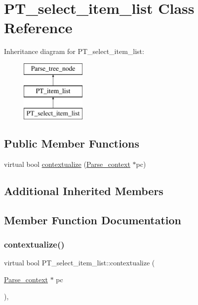 \hypertarget{classPT__select__item__list}{}\section{P\+T\+\_\+select\+\_\+item\+\_\+list Class Reference}
\label{classPT__select__item__list}
Inheritance diagram for P\+T\+\_\+select\+\_\+item\+\_\+list\+:\begin{figure}[H]
\begin{center}
\leavevmode
\includegraphics[height=3.000000cm]{classPT__select__item__list}
\end{center}
\end{figure}
\subsection*{Public Member Functions}
\begin{DoxyCompactItemize}
\item 
virtual bool \mbox{\hyperlink{classPT__select__item__list_a76b3fc28ad05e3c04a5d6223e8cbeade}{contextualize}} (\mbox{\hyperlink{structParse__context}{Parse\+\_\+context}} $\ast$pc)
\end{DoxyCompactItemize}
\subsection*{Additional Inherited Members}


\subsection{Member Function Documentation}
\mbox{\label{classPT__select__item__list_a76b3fc28ad05e3c04a5d6223e8cbeade}} 
\subsubsection{\texorpdfstring{contextualize()}{contextualize()}}
{\footnotesize\ttfamily virtual bool P\+T\+\_\+select\+\_\+item\+\_\+list\+::contextualize (\begin{DoxyParamCaption}\item[{\mbox{\hyperlink{structParse__context}{Parse\+\_\+context}} $\ast$}]{pc }\end{DoxyParamCaption})\hspace{0.3cm}{\ttfamily [inline]}, {\ttfamily [virtual]}}

